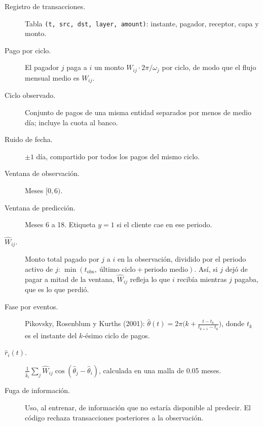 \begin{terminos}
\begin{description}
\item[Registro de transacciones.] Tabla \texttt{(t, src, dst, layer, amount)}: instante,
pagador, receptor, capa y monto.
\item[Pago por ciclo.] El pagador $j$ paga a $i$ un monto $W_{ij}\cdot2\pi/\omega_j$ por
ciclo, de modo que el flujo mensual medio es $W_{ij}$.
\item[Ciclo observado.] Conjunto de pagos de una misma entidad separados por menos de
medio día; incluye la cuota al banco.
\item[Ruido de fecha.] $\pm1$ día, compartido por todos los pagos del mismo ciclo.
\item[Ventana de observación.] Meses $[0,6)$.
\item[Ventana de predicción.] Meses 6 a 18. Etiqueta $y=1$ si el cliente cae en ese
periodo.
\item[$\hat W_{ij}$.] Monto total pagado por $j$ a $i$ en la observación, dividido por
el periodo activo de $j$: $\min(t_\text{obs},\ \text{último ciclo}+\text{periodo medio})$.
Así, si $j$ dejó de pagar a mitad de la ventana, $\hat W_{ij}$ refleja lo que $i$ recibía
mientras $j$ pagaba, que es lo que perdió.
\item[Fase por eventos.] Pikovsky, Rosenblum y Kurths (2001):
$\hat\theta(t)=2\pi\bigl(k+\frac{t-t_k}{t_{k+1}-t_k}\bigr)$, donde $t_k$ es el instante del
$k$-ésimo ciclo de pagos.
\item[$\hat r_i(t)$.] $\frac1{\hat k_i}\sum_j\hat W_{ij}\cos(\hat\theta_j-\hat\theta_i)$,
calculada en una malla de 0.05 meses.
\item[Fuga de información.] Uso, al entrenar, de información que no estaría disponible al
predecir. El código rechaza transacciones posteriores a la observación.
\end{description}
\end{terminos}
\begin{preguntas}
\end{preguntas}

